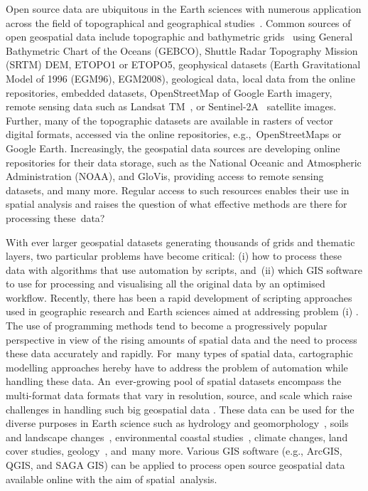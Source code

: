 \documentclass[technologies,article,accept,pdftex,moreauthors]{Definitions/mdpi}
\begin{document}
Open source data are ubiquitous in the Earth sciences with numerous application across the field of topographical and geographical studies~\cite{WAGEMANN2021104916}. Common sources of open geospatial data include topographic and bathymetric grids~\cite{Basith,Habib} using General Bathymetric Chart of the Oceans (GEBCO), Shuttle Radar Topography Mission (SRTM) DEM, ETOPO1 or ETOPO5, geophysical datasets (Earth Gravitational Model of 1996 (EGM96), EGM2008){, }geological data{, }local data from the online repositories, embedded datasets, OpenStreetMap of Google Earth imagery, remote sensing data such as Landsat TM~\cite{YIN2021102457}, or Sentinel-2A~\cite{app13042525} satellite images. {Further,} many of the topographic datasets are available in rasters of vector digital formats, accessed via {the }online repositories, e.g.,~OpenStreetMaps or Google Earth. Increasingly, {the }geospatial data sources are developing online repositories for their data storage, such as the National Oceanic and Atmospheric Administration (NOAA), and GloVis, providing access to remote sensing datasets, {and many more}. Regular access to such resources enables their use in spatial analysis and raises the question of what effective methods are there for processing these~data?

{With ever larger geospatial datasets generating thousands of grids and thematic layers, two particular problems have become critical: (i) how to process these data with algorithms that use automation by scripts, and~(ii) which GIS software to use for processing and visualising all the original data by an optimised workflow. Recently, there has been a rapid development of }scripting approaches{ }used in geographic research and Earth sciences {aimed at addressing problem (i)} \cite{Rey}. {The use of programming methods }tend to become a progressively popular perspective in view of the rising amounts of spatial data and the need to process these data accurately {and} rapidly. For~many types of spatial data, cartographic modelling approaches hereby have to address the problem of automation while handling these data. An~ever-growing pool of spatial datasets encompass the multi-format data formats that vary in resolution, source, and scale {which raise challenges in handling such big geospatial data} \cite{ZHANG2019101374,KIM2023100368}. These data can be used for the diverse purposes in Earth science such as hydrology and geomorphology~\cite{Teixeira}, soils and landscape changes~\cite{Savulescu}, environmental coastal studies~\cite{Hernandez}, climate changes, land cover studies, geology~\cite{app7090956}, and~many more. Various GIS software {(e.g., ArcGIS, QGIS, and SAGA GIS)} can be applied to process open source geospatial data available online with the aim of spatial~analysis. 
\end{document}
